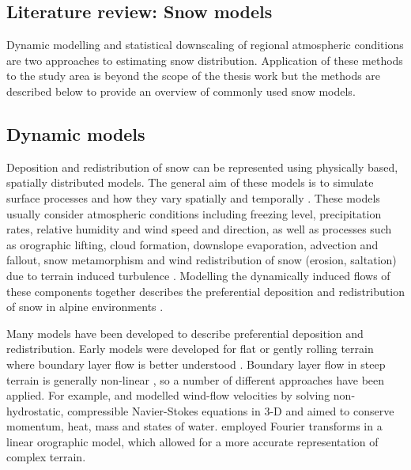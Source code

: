 \documentclass{sfuthesis}
\begin{document}
{\backmatter%
	
	

\begin{appendices} 

\chapter{Literature review: Snow models }
\label{app:snow_models}

Dynamic modelling and statistical downscaling of regional atmospheric conditions are two approaches to estimating snow distribution. Application of these methods to the study area is beyond the scope of the thesis work but the methods are described below to provide an overview of commonly used snow models. 

\section{Dynamic models}

Deposition and redistribution of snow can be represented using physically based, spatially distributed models. The general aim of these models is to simulate surface processes and how they vary spatially and temporally \citep{Mott2008}. These models usually consider atmospheric conditions including freezing level, precipitation rates, relative humidity and wind speed and direction, as well as processes such as orographic lifting, cloud formation, downslope evaporation, advection and fallout, snow metamorphism and wind redistribution of snow (erosion, saltation) due to terrain induced turbulence \citep{Smith2004, Liston2006, Lehning2008, Mott2008}.  Modelling the dynamically induced flows of these components together describes the preferential deposition and redistribution of snow in alpine environments \citep{Lehning2008,Mott2008,Dadic2010}.

Many models have been developed to describe preferential deposition and redistribution. Early models were developed for flat or gently rolling terrain where boundary layer flow is better understood \citep{Dadic2010}. Boundary layer flow in steep terrain is generally non-linear \citep{Mott2008, Dadic2010}, so a number of different approaches have been applied.  For example, \cite{Dadic2010} and \cite{Lehning2008} modelled wind-flow velocities by solving non-hydrostatic, compressible Navier-Stokes equations in 3-D and aimed to conserve momentum, heat, mass and states of water. \cite{Smith2004} employed Fourier transforms in a linear orographic model, which allowed for a more accurate representation of complex terrain. 


\end{appendices}}
\end{document}
